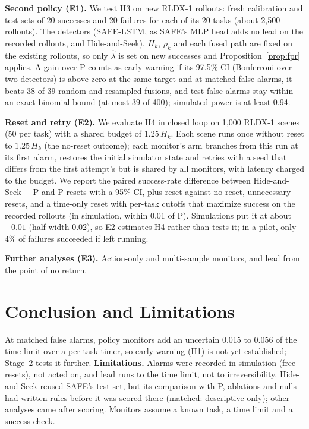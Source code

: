 \documentclass[conference]{IEEEtran}
\begin{document}
\textbf{Second policy (E1).} We test H3 on new RLDX-1 rollouts: fresh calibration and test sets
of 20 successes and 20 failures for each of its 20 tasks (about 2,500 rollouts). The detectors
(SAFE-LSTM, as SAFE's MLP head adds no lead on the recorded rollouts, and Hide-and-Seek), $H_k$,
$\rho_k$ and each fused path are fixed on the existing rollouts, so only $\hat\lambda$ is set on
new successes and Proposition~\ref{prop:fpr} applies. A gain over P counts as early warning if
its 97.5\% CI (Bonferroni over two detectors) is above zero at the same target and at matched
false alarms, it beats 38 of 39 random and resampled fusions, and test false alarms stay within
an exact binomial bound (at most 39 of 400); simulated power is at least 0.94.

\textbf{Reset and retry (E2).} We evaluate H4 in closed loop on 1,000 RLDX-1 scenes (50 per
task) with a shared budget of $1.25\,H_k$. Each scene runs once without reset to $1.25\,H_k$
(the no-reset outcome); each monitor's arm branches from this run at its first alarm, restores
the initial simulator state and retries with a seed that differs from the first attempt's but is
shared by all monitors, with latency charged to the budget. We report the paired success-rate difference between Hide-and-Seek + P and P resets with
a 95\% CI, plus reset against no reset, unnecessary resets, and a time-only reset with per-task
cutoffs that maximize success on the recorded rollouts (in simulation, within 0.01 of P). Simulations put it at about $+0.01$ (half-width 0.02), so E2 estimates H4 rather than tests it; in a pilot, only 4\% of failures succeeded if left running.

\textbf{Further analyses (E3).} Action-only and multi-sample monitors, and lead from the
point of no return.

\section{Conclusion and Limitations}

At matched false alarms, policy monitors add an uncertain 0.015 to 0.056 of the time limit over
a per-task timer, so early warning (H1) is not yet established; Stage~2 tests it further.
\textbf{Limitations.} Alarms were recorded in simulation (free resets), not acted on, and lead
runs to the time limit, not to irreversibility. Hide-and-Seek reused SAFE's test set, but its
comparison with P, ablations and nulls had written rules before it was scored there (matched:
descriptive only); other analyses came after scoring. Monitors assume a known task, a time
limit and a success check.

\clearpage


\end{document}
